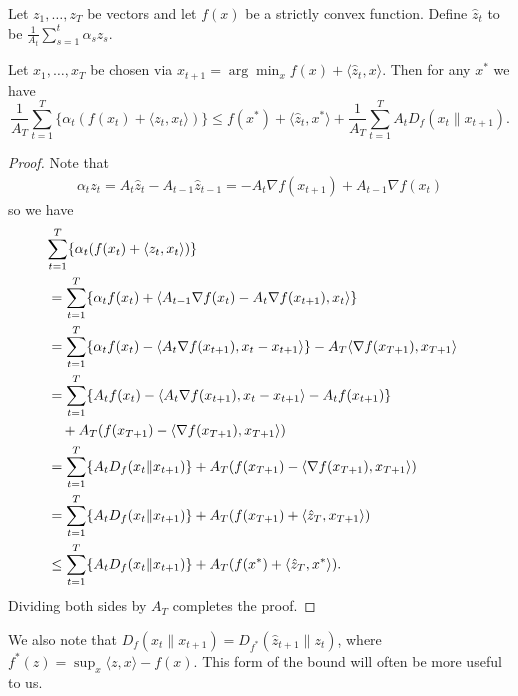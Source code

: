 \documentclass{article}
\begin{document}
\begin{lemma}
\label{lem:ftl}
Let $z_1,\ldots,z_T$ be vectors and let $f(x)$ be a strictly convex 
function. Define $\hat{z}_t$ to be $\frac{1}{A_t} \sum_{s=1}^t \alpha_s z_s$.

Let $x_1,\ldots,x_T$ be chosen via $x_{t+1} = \arg\min_{x} f(x) + \langle \hat{z}_t, x\rangle$. 
Then for any $x^*$ we have
\begin{equation}
\frac{1}{A_T} \sum_{t=1}^T \{\alpha_t(f(x_t) + \langle z_t, x_t \rangle)\} \leq f(x^*) + \langle \hat{z}_t, x^* \rangle + \frac{1}{A_T} \sum_{t=1}^T A_t D_{f}(x_t \| x_{t+1}). 
\end{equation}
\end{lemma}
\begin{proof}
Note that 
\begin{align}
\alpha_{t}z_{t} = A_{t}\hat z_{t} - A_{t-1}\hat z_{t-1} = - A_{t}\nabla f(x_{t+1}) + A_{t-1} \nabla f(x_{t}) 
\end{align}
so we have
\begin{align}
\lefteqn{\sum_{t=1}^T \{\alpha_t(f(x_t) + \langle z_t, x_t \rangle)\}} \\
 &= \sum_{t=1}^T \{\alpha_t f(x_t) + \langle A_{t-1} \nabla f(x_t) - A_t \nabla f(x_{t+1}), x_t \rangle\} \\
 &= \sum_{t=1}^T \{\alpha_t f(x_t) - \langle A_{t} \nabla f(x_{t+1}), x_t-x_{t+1} \rangle\} - A_{T}\langle \nabla f(x_{T+1}), x_{T+1} \rangle \\
 &= \sum_{t=1}^T \{A_t f(x_t) - \langle A_{t} \nabla f(x_{t+1}), x_t-x_{t+1} \rangle - A_t f(x_{t+1})\}  \\
 &\quad+ A_T(f(x_{T+1}) - \langle \nabla f(x_{T+1}), x_{T+1} \rangle) \nonumber \\
 &= \sum_{t=1}^T \{A_tD_f(x_t \| x_{t+1})\} + A_T(f(x_{T+1}) - \langle \nabla f(x_{T+1}), x_{T+1} \rangle) \\
 &= \sum_{t=1}^T \{A_tD_f(x_t \| x_{t+1})\} + A_T(f(x_{T+1}) + \langle \hat{z}_T, x_{T+1} \rangle) \\
 &\leq \sum_{t=1}^T \{A_tD_f(x_t \| x_{t+1})\} + A_T(f(x^*) + \langle \hat{z}_T, x^* \rangle). \\
\end{align}
Dividing both sides by $A_T$ completes the proof.
\end{proof}
We also note that $D_f(x_t \| x_{t+1}) = D_{f^*}(\hat{z}_{t+1} \| z_t)$, where $f^*(z) = \sup_x \langle z,x\rangle - f(x)$. 
This form of the bound will often be more useful to us.
\end{document}
